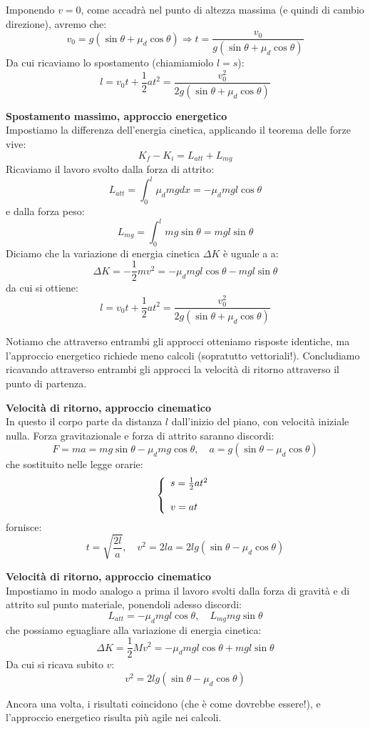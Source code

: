 \documentclass[a4paper,12pt]{article}
\begin{document}
Imponendo $v = 0$, come accadrà nel punto di altezza massima (e quindi di cambio direzione), avremo che:
$$ v_0 = g(\sin{\theta} + \mu_d\cos{\theta}) \Rightarrow t = \frac{v_0}{g(\sin{\theta} + \mu_d\cos{\theta})} $$
Da cui ricaviamo lo spostamento (chiamiamiolo $l = s$):
$$ l = v_0t + \frac{1}{2}at^2 = \frac{v_0^2}{2g(\sin{\theta} + \mu_d\cos{\theta})} $$
\par\smallskip
\textbf{Spostamento massimo, approccio energetico} \\
Impostiamo la differenza dell'energia cinetica, applicando il teorema delle forze vive:
$$ K_f - K_i = L_{att} + L_{mg} $$
Ricaviamo il lavoro svolto dalla forza di attrito:
$$ L_{att} = \int_0^l \mu_d mg dx = -\mu_d mg l\cos{\theta} $$
e dalla forza peso:
$$ L_{mg} = \int_0^l mg\sin{\theta} = mgl\sin{\theta} $$
Diciamo che la variazione di energia cinetica $\Delta K$ è uguale a a:
$$ \Delta K = -\frac{1}{2}mv^2 = -\mu_dmgl\cos{\theta} - mgl\sin{\theta} $$
da cui si ottiene:
$$ l = v_0t + \frac{1}{2}at^2 = \frac{v_0^2}{2g(\sin{\theta} + \mu_d\cos{\theta})} $$
\par\smallskip
Notiamo che attraverso entrambi gli approcci otteniamo risposte identiche, ma l'approccio energetico richiede
meno calcoli (sopratutto vettoriali!). Concludiamo ricavando attraverso entrambi gli approcci la velocità
di ritorno attraverso il punto di partenza.
\par\smallskip
\textbf{Velocità di ritorno, approccio cinematico} \\
In questo il corpo parte da distanza $l$ dall'inizio del piano,  con velocità iniziale nulla. Forza gravitazionale e
forza di attrito saranno discordi:
$$ F = ma = mg\sin{\theta} - \mu_dmg\cos{\theta}, \quad a = g(\sin{\theta} - \mu_d\cos{\theta}) $$
che sostituito nelle legge orarie:
$$
\begin{aligned}
\left\{\begin{array}{l}
  s = \frac{1}{2}at^2 \cr \\
  v = at
\end{array}\right.
\end{aligned}
$$
fornisce:
$$ t = \sqrt{\frac{2l}{a}}, \quad v^2 = 2la = 2lg(\sin{\theta} - \mu_d\cos{\theta}) $$
\par\smallskip
\textbf{Velocità di ritorno, approccio cinematico} \\
Impostiamo in modo analogo a prima il lavoro svolti dalla forza di gravità e di attrito sul punto materiale,
ponendoli adesso discordi:
$$ L_{att} = -\mu_d mgl\cos{\theta}, \quad L_{mg} mg\sin{\theta} $$
che possiamo eguagliare alla variazione di energia cinetica:
$$ \Delta K = \frac{1}{2}Mv^2 = -\mu_d mgl\cos{\theta} + mgl\sin{\theta} $$
Da cui si ricava subito $v$:
$$ v^2 = 2lg(\sin{\theta} - \mu_d\cos{\theta}) $$
\par\smallskip
Ancora una volta, i risultati coincidono (che è come dovrebbe essere!), e l'approccio energetico risulta più agile nei calcoli.
\end{document}
